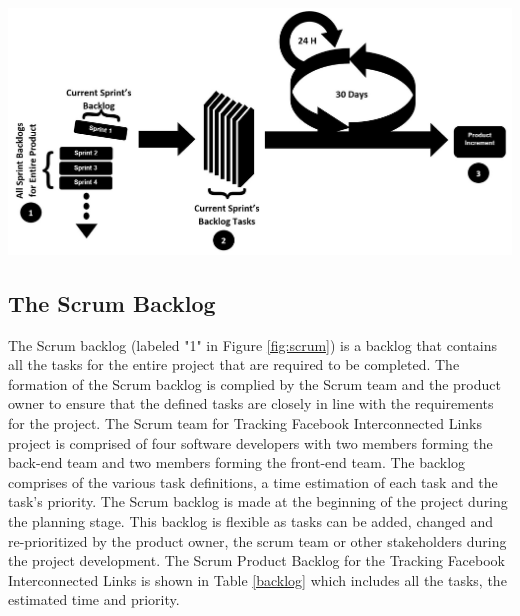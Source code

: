 \documentclass[12pt,onecolumn]{article}
\begin{document}
\begin{center}
	\includegraphics[width=\textwidth]{scrum}
	 \label{fig:scrum}
\end{center}
		
		

	
	\subsection{The Scrum Backlog } \label{scrumback}
	The Scrum backlog (labeled "1" in Figure \ref{fig:scrum}) is a backlog that contains all the tasks for the entire project that are required to be completed. The formation of the Scrum backlog is complied by the Scrum team and the product owner to ensure that the defined tasks are closely in line with the requirements for the project. The Scrum team for Tracking Facebook Interconnected Links project is comprised of four software developers with two members forming the back-end team and two members forming the front-end team. The backlog comprises of the various task definitions, a time estimation of each task and the task's priority. The Scrum backlog is made at the beginning of the project during the planning stage. This backlog is flexible as tasks can be added, changed and re-prioritized by the product owner, the scrum team or other stakeholders during the project development. The Scrum Product Backlog for the Tracking Facebook Interconnected Links is shown in Table \ref{backlog} which includes all the tasks, the estimated time and priority.     
	
\end{document}
